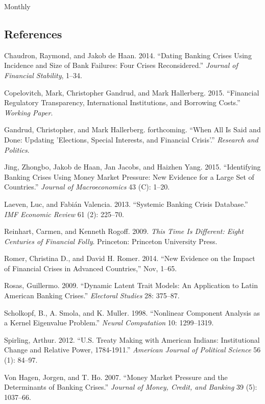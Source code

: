 \documentclass[]{article}
\begin{document}
Monthly

\subsection*{References}\label{references}

Chaudron, Raymond, and Jakob de Haan. 2014. ``Dating Banking Crises
Using Incidence and Size of Bank Failures: Four Crises Reconsidered.''
\emph{Journal of Financial Stability}, 1--34.

Copelovitch, Mark, Christopher Gandrud, and Mark Hallerberg. 2015.
``Financial Regulatory Transparency, International Institutions, and
Borrowing Costs.'' \emph{Working Paper}.

Gandrud, Christopher, and Mark Hallerberg. forthcoming. ``When All Is
Said and Done: Updating 'Elections, Special Interests, and Financial
Crisis'.'' \emph{Research and Politics}.

Jing, Zhongbo, Jakob de Haan, Jan Jacobs, and Haizhen Yang. 2015.
``Identifying Banking Crises Using Money Market Pressure: New Evidence
for a Large Set of Countries.'' \emph{Journal of Macroeconomics} 43 (C):
1--20.

Laeven, Luc, and Fabi{á}n Valencia. 2013. ``Systemic Banking Crisis
Database.'' \emph{IMF Economic Review} 61 (2): 225--70.

Reinhart, Carmen, and Kenneth Rogoff. 2009. \emph{This Time Is
Different: Eight Centuries of Financial Folly}. Princeton: Princeton
University Press.

Romer, {Christina D.}, and {David H.} Romer. 2014. ``New Evidence on the
Impact of Financial Crises in Advanced Countries,'' Nov, 1--65.

Rosas, Guillermo. 2009. ``Dynamic Latent Trait Models: An Application to
Latin American Banking Crises.'' \emph{Electoral Studies} 28: 375--87.

Scholkopf, B., A. Smola, and K. Muller. 1998. ``Nonlinear Component
Analysis as a Kernel Eigenvalue Problem.'' \emph{Neural Computation} 10:
1299--1319.

Spirling, Arthur. 2012. ``U.S. Treaty Making with American Indians:
Institutional Change and Relative Power, 1784-1911.'' \emph{American
Journal of Political Science} 56 (1): 84--97.

{Von Hagen}, Jorgen, and T. Ho. 2007. ``Money Market Pressure and the
Determinants of Banking Crises.'' \emph{Journal of Money, Credit, and
Banking} 39 (5): 1037--66.
\end{document}
